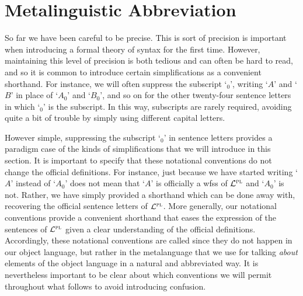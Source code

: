 \section{Metalinguistic Abbreviation}%
  \label{sec:abbreviation}
  
So far we have been careful to be precise.
This is sort of precision is important when introducing a formal theory of syntax for the first time.
However, maintaining this level of precision is both tedious and can often be hard to read, and so it is common to introduce certain simplifications as a convenient shorthand.
For instance, we will often suppress the subscript `$_0$', writing `$A$' and `$B$' in place of `$A_0$' and `$B_0$', and so on for the other twenty-four sentence letters in which `$_0$' is the subscript.
In this way, subscripts are rarely required, avoiding quite a bit of trouble by simply using different capital letters. %

However simple, suppressing the subscript `$_0$' in sentence letters provides a paradigm case of the kinds of simplifications that we will introduce in this section.
It is important to specify that these notational conventions do not change the official definitions.
For instance, just because we have started writing `$A$' instead of `$A_0$' does not mean that `$A$' is officially a wfss of $\mathcal{L}^{\textsc{pl}}$ and `$A_0$' is not.
Rather, we have simply provided a shorthand which can be done away with, recovering the official sentence letters of $\mathcal{L}^{\textsc{pl}}$.
More generally, our notational conventions provide a convenient shorthand that eases the expression of the sentences of $\mathcal{L}^{\textsc{pl}}$ given a clear understanding of the official definitions.
Accordingly, these notational conventions are called  since they do not happen in our object language, but rather in the metalanguage that we use for talking \textit{about} elements of the object language in a natural and abbreviated way.
It is nevertheless important to be clear about which conventions we will permit throughout what follows to avoid introducing confusion.

